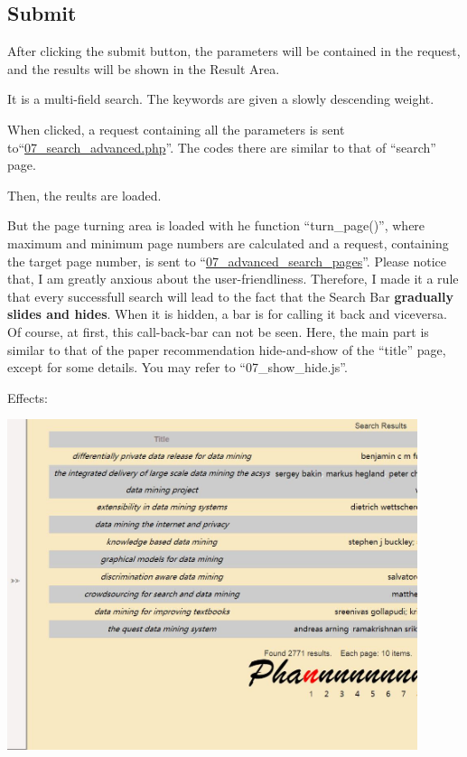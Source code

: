 \documentclass[10pt,twoside,a4paper,titlepage]{article}
\begin{document}
	\subsection{Submit}
		After clicking the submit button, the parameters will be contained in the request, and the results will be shown in the Result Area.\par
		It is a multi-field search. The keywords are given a slowly descending weight.\par
		When clicked, a request containing all the parameters is sent to\newline“\underline{07\_search\_advanced.php}”. The codes there are similar to that of “search” page.\par
		Then, the reults are loaded.\par
		But the page turning area is loaded with he function “turn\_page()”, where maximum and minimum page numbers are calculated and a request, containing the target page number, is sent to “\underline{07\_advanced\_search\_pages}”.
		Please notice that, I am greatly anxious about the user-friendliness. Therefore, I made it a rule that every successfull search will lead to the fact that the Search Bar \textbf{gradually slides and hides}. When it is hidden, a bar is for calling it back and viceversa. Of course, at first, this call-back-bar can not be seen. Here, the main part is similar to that of the paper recommendation hide-and-show of the “title” page, except for some details. You may refer to “07\_show\_hide.js”.\newline\par
		Effects:\newline\par
		\includegraphics[width=0.9\textwidth]{gzl/15.jpg}
\end{document}
